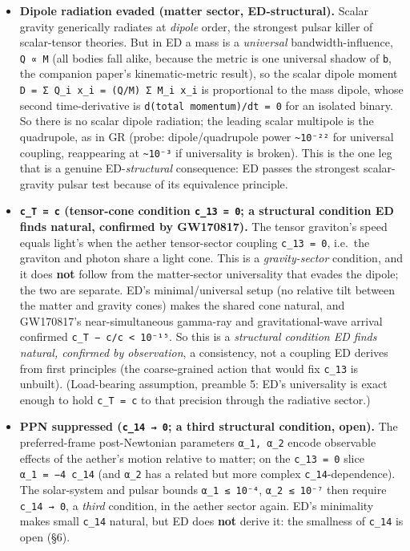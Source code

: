 \documentclass[
]{article}
\begin{document}
\begin{itemize}
\item
  \textbf{Dipole radiation evaded (matter sector, ED-structural).}
  Scalar gravity generically radiates at \emph{dipole} order, the
  strongest pulsar killer of scalar-tensor theories. But in ED a mass is
  a \emph{universal} bandwidth-influence, \texttt{Q\ ∝\ M} (all bodies
  fall alike, because the metric is one universal shadow of \texttt{b},
  the companion paper's kinematic-metric result), so the scalar dipole
  moment \texttt{D\ =\ Σ\ Q\_i\ x\_i\ =\ (Q/M)\ Σ\ M\_i\ x\_i} is
  proportional to the mass dipole, whose second time-derivative is
  \texttt{d(total\ momentum)/dt\ =\ 0} for an isolated binary. So there
  is no scalar dipole radiation; the leading scalar multipole is the
  quadrupole, as in GR (probe: dipole/quadrupole power
  \texttt{\textasciitilde{}10⁻²²} for universal coupling, reappearing at
  \texttt{\textasciitilde{}10⁻³} if universality is broken). This is the
  one leg that is a genuine ED-\emph{structural} consequence: ED passes
  the strongest scalar-gravity pulsar test because of its equivalence
  principle.
\item
  \textbf{\texttt{c\_T\ =\ c} (tensor-cone condition
  \texttt{c\_13\ =\ 0}; a structural condition ED finds natural,
  confirmed by GW170817).} The tensor graviton's speed equals light's
  when the aether tensor-sector coupling \texttt{c\_13\ =\ 0}, i.e.~the
  graviton and photon share a light cone. This is a
  \emph{gravity-sector} condition, and it does \textbf{not} follow from
  the matter-sector universality that evades the dipole; the two are
  separate. ED's minimal/universal setup (no relative tilt between the
  matter and gravity cones) makes the shared cone natural, and
  GW170817's near-simultaneous gamma-ray and gravitational-wave arrival
  confirmed
  \texttt{\textbar{}c\_T\ −\ c\textbar{}/c\ \textless{}\ 10⁻¹⁵}. So this
  is a \emph{structural condition ED finds natural, confirmed by
  observation}, a consistency, not a coupling ED derives from first
  principles (the coarse-grained action that would fix \texttt{c\_13} is
  unbuilt). (Load-bearing assumption, preamble 5: ED's universality is
  exact enough to hold \texttt{c\_T\ =\ c} to that precision through the
  radiative sector.)
\item
  \textbf{PPN suppressed (\texttt{c\_14\ →\ 0}; a third structural
  condition, open).} The preferred-frame post-Newtonian parameters
  \texttt{α\_1,\ α\_2} encode observable effects of the aether's motion
  relative to matter; on the \texttt{c\_13\ =\ 0} slice
  \texttt{α\_1\ =\ −4\ c\_14} (and \texttt{α\_2} has a related but more
  complex \texttt{c\_14}-dependence). The solar-system and pulsar bounds
  \texttt{\textbar{}α\_1\textbar{}\ ≲\ 10⁻⁴},
  \texttt{\textbar{}α\_2\textbar{}\ ≲\ 10⁻⁷} then require
  \texttt{c\_14\ →\ 0}, a \emph{third} condition, in the aether sector
  again. ED's minimality makes small \texttt{c\_14} natural, but ED does
  \textbf{not} derive it: the smallness of \texttt{c\_14} is open (§6).
\end{itemize}
\end{document}
